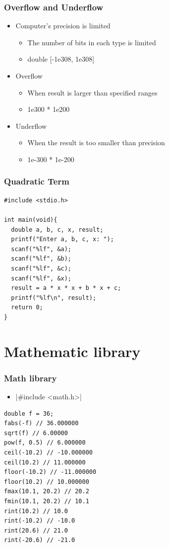 \documentclass{../c-lecture}
\begin{document}
\begin{frame}
  \frametitle{Overflow and Underflow}
  \begin{itemize}
    \item Computer's precision is limited
    \begin{itemize}
      \item
        {\color{Orange} The number of bits} in each type is
        limited
      \item double [-1e308, 1e308]
    \end{itemize}
    \item Overflow
    \begin{itemize}
      \item When result is larger than specified ranges
      \item 1e300 * 1e200
    \end{itemize}
    \item Underflow
    \begin{itemize}
      \item When the result is too smaller than precision
      \item 1e-300 * 1e-200
    \end{itemize}
  \end{itemize}
\end{frame}

\begin{frame}[fragile]
  \frametitle{Quadratic Term}
  \begin{verbatim}
#include <stdio.h>

int main(void){
  double a, b, c, x, result;
  printf("Enter a, b, c, x: ");
  scanf("%lf", &a);
  scanf("%lf", &b);
  scanf("%lf", &c);
  scanf("%lf", &x);
  result = a * x * x + b * x + c;
  printf("%lf\n", result);
  return 0;
}
  \end{verbatim}
\end{frame}

\section{Mathematic library}

\begin{frame}[fragile]
  \frametitle{Math library}
  \begin{itemize}
    \item {}|#include <math.h>|
  \end{itemize}
  \scriptsize
  \begin{verbatim}
double f = 36;
fabs(-f) // 36.000000
sqrt(f) // 6.00000
pow(f, 0.5) // 6.000000
ceil(-10.2) // -10.000000
ceil(10.2) // 11.000000
floor(-10.2) // -11.000000
floor(10.2) // 10.000000
fmax(10.1, 20.2) // 20.2
fmin(10.1, 20.2) // 10.1
rint(10.2) // 10.0
rint(-10.2) // -10.0
rint(20.6) // 21.0
rint(-20.6) // -21.0
  \end{verbatim}
\end{frame}
\end{document}
